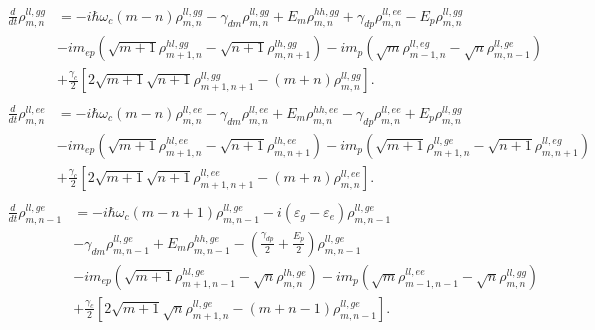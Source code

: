 \documentclass[aps,prb,
superscriptaddress,
,floatfix,footinbib,longbibliography,
preprint
]{revtex4-2}
\begin{document}
%
\begin{equation}
\begin{split}
\frac{d}{dt}\rho_{m,n}^{ll,gg}&=-i\hbar\omega_{c}(m-n)\rho_{m,n}^{ll,gg}-\gamma_{dm}\rho_{m,n}^{ll,gg}
+E_{m}\rho_{m,n}^{hh,gg}+\gamma_{dp}\rho_{m,n}^{ll,ee}-E_{p}\rho_{m,n}^{ll,gg}\\
&-im_{ep}(\sqrt{m+1}\rho_{m+1,n}^{hl,gg}-\sqrt{n+1}\rho_{m,n+1}^{lh,gg})
-im_{p}(\sqrt{m}\rho_{m-1,n}^{ll,eg}-\sqrt{n}\rho_{m,n-1}^{ll,ge})\\
&+\frac{\gamma_{c}}{2}[2\sqrt{m+1}\sqrt{n+1}\rho_{m+1,n+1}^{ll,gg}-(m+n)\rho_{m,n}^{ll,gg}].\\
\end{split}
\label{ll,gg}
\end{equation}
%
\begin{equation}
\begin{split}
\frac{d}{dt}\rho_{m,n}^{ll,ee}&=-i\hbar\omega_{c}(m-n)\rho_{m,n}^{ll,ee}-\gamma_{dm}\rho_{m,n}^{ll,ee}
+E_{m}\rho_{m,n}^{hh,ee}-\gamma_{dp}\rho_{m,n}^{ll,ee}+E_{p}\rho_{m,n}^{ll,gg}\\
&-im_{ep}(\sqrt{m+1}\rho_{m+1,n}^{hl,ee}-\sqrt{n+1}\rho_{m,n+1}^{lh,ee})
-im_{p}(\sqrt{m+1}\rho_{m+1,n}^{ll,ge}-\sqrt{n+1}\rho_{m,n+1}^{ll,eg})\\
&+\frac{\gamma_{c}}{2}[2\sqrt{m+1}\sqrt{n+1}\rho_{m+1,n+1}^{ll,ee}-(m+n)\rho_{m,n}^{ll,ee}].\\
\end{split}
\label{ll,ee}
\end{equation}
%
\begin{equation}
\begin{split}
\frac{d}{dt}\rho_{m,n-1}^{ll,ge}&=-i\hbar\omega_{c}(m-n+1)\rho_{m,n-1}^{ll,ge}
-i(\varepsilon_{g}-\varepsilon_{e})\rho_{m,n-1}^{ll,ge}\\
&-\gamma_{dm}\rho_{m,n-1}^{ll,ge}+E_{m}\rho_{m,n-1}^{hh,ge}
-(\frac{\gamma_{dp}}{2}+\frac{{E_{p}}}{2})\rho_{m,n-1}^{ll,ge}\\
&-im_{ep}(\sqrt{m+1}\rho_{m+1,n-1}^{hl,ge}-\sqrt{n}\rho_{m,n}^{lh,ge})
-im_{p}(\sqrt{m}\rho_{m-1,n-1}^{ll,ee}-\sqrt{n}\rho_{m,n}^{ll,gg})\\
&+\frac{\gamma_{c}}{2}[2\sqrt{m+1}\sqrt{n}\rho_{m+1,n}^{ll,ge}-(m+n-1)\rho_{m,n-1}^{ll,ge}].\\
\end{split}
\label{ll,ge}
\end{equation}
\end{document}
